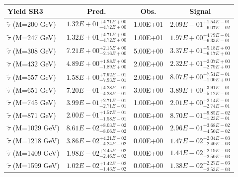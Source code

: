 \documentclass{article}
\begin{document}
 \begin{center}
 \begin{tabular}{ |l|c|c|c| } 
 \hline
 Yield SR3 & Pred. & Obs. & Signal \\
 \hline
 \hline
 $\tilde{\tau}$ (M=200 GeV) & $1.32E+01^{+4.71E+00}_{-4.72E+00}$ & 1.00E+01 & $2.09E-01^{+1.54E-01}_{-6.07E-02}$ \\
 \hline
 $\tilde{\tau}$ (M=247 GeV) & $1.32E+01^{+4.71E+00}_{-4.72E+00}$ & 1.00E+01 & $1.97E+00^{+4.79E-01}_{-6.33E-01}$ \\
 \hline
 $\tilde{\tau}$ (M=308 GeV) & $7.21E+00^{+2.15E+00}_{-2.16E+00}$ & 5.00E+00 & $3.37E+01^{+5.18E+00}_{-6.17E+00}$ \\
 \hline
 $\tilde{\tau}$ (M=432 GeV) & $4.89E+00^{+1.88E+00}_{-1.89E+00}$ & 2.00E+00 & $2.32E+01^{+2.07E+00}_{-2.79E+00}$ \\
 \hline
 $\tilde{\tau}$ (M=557 GeV) & $1.58E+00^{+7.92E-01}_{-7.93E-01}$ & 2.00E+00 & $8.07E+00^{+7.51E-01}_{-1.00E+00}$ \\
 \hline
 $\tilde{\tau}$ (M=651 GeV) & $7.20E-01^{+4.28E-01}_{-4.28E-01}$ & 3.00E+00 & $3.89E+00^{+3.91E-01}_{-5.12E-01}$ \\
 \hline
 $\tilde{\tau}$ (M=745 GeV) & $3.99E-01^{+2.71E-01}_{-2.71E-01}$ & 1.00E+00 & $2.01E+00^{+2.14E-01}_{-2.74E-01}$ \\
 \hline
 $\tilde{\tau}$ (M=871 GeV) & $2.00E-01^{+1.57E-01}_{-1.58E-01}$ & 0.00E+00 & $8.70E-01^{+9.85E-02}_{-1.23E-01}$ \\
 \hline
 $\tilde{\tau}$ (M=1029 GeV) & $8.61E-02^{+8.03E-02}_{-8.06E-02}$ & 0.00E+00 & $2.96E-01^{+3.68E-02}_{-4.50E-02}$ \\
 \hline
 $\tilde{\tau}$ (M=1218 GeV) & $3.86E-02^{+4.21E-02}_{-4.24E-02}$ & 0.00E+00 & $1.47E-02^{+2.04E-03}_{-2.40E-03}$ \\
 \hline
 $\tilde{\tau}$ (M=1409 GeV) & $1.98E-02^{+2.45E-02}_{-2.46E-02}$ & 0.00E+00 & $1.44E-02^{+2.19E-03}_{-2.50E-03}$ \\
 \hline
 $\tilde{\tau}$ (M=1599 GeV) & $1.02E-02^{+1.42E-02}_{-1.43E-02}$ & 0.00E+00 & $1.38E-02^{+2.27E-03}_{-2.53E-03}$ \\
 \hline
 \end{tabular}
 \end{center}
 
\end{document}
